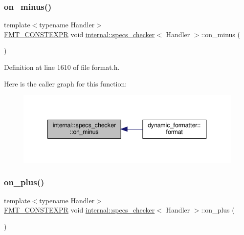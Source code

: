 \subsubsection{\texorpdfstring{on\+\_\+minus()}{on\_minus()}}
{\footnotesize\ttfamily template$<$typename Handler$>$ \\
\hyperlink{core_8h_a69201cb276383873487bf68b4ef8b4cd}{F\+M\+T\+\_\+\+C\+O\+N\+S\+T\+E\+X\+PR} void \hyperlink{classinternal_1_1specs__checker}{internal\+::specs\+\_\+checker}$<$ Handler $>$\+::on\+\_\+minus (\begin{DoxyParamCaption}{ }\end{DoxyParamCaption})\hspace{0.3cm}{\ttfamily [inline]}}



Definition at line 1610 of file format.\+h.

Here is the caller graph for this function\+:
\nopagebreak
\begin{figure}[H]
\begin{center}
\leavevmode
\includegraphics[width=340pt]{classinternal_1_1specs__checker_ab52e2fc452636fd081d9392956dfe6e9_icgraph}
\end{center}
\end{figure}
\mbox{\label{classinternal_1_1specs__checker_a12d7b0e358cb4fa37ea1e743fc91df62}} 
\subsubsection{\texorpdfstring{on\+\_\+plus()}{on\_plus()}}
{\footnotesize\ttfamily template$<$typename Handler$>$ \\
\hyperlink{core_8h_a69201cb276383873487bf68b4ef8b4cd}{F\+M\+T\+\_\+\+C\+O\+N\+S\+T\+E\+X\+PR} void \hyperlink{classinternal_1_1specs__checker}{internal\+::specs\+\_\+checker}$<$ Handler $>$\+::on\+\_\+plus (\begin{DoxyParamCaption}{ }\end{DoxyParamCaption})\hspace{0.3cm}{\ttfamily [inline]}}



